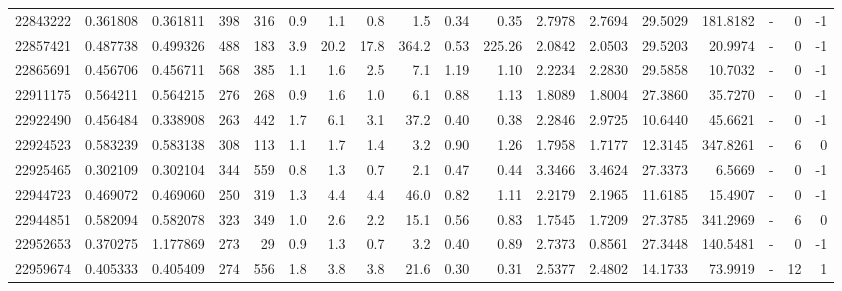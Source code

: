 \begin{tabular}{rrrrrrrrrrrrrrrlrr}
  22843222 & 0.361808 &   0.361811 &  398 &  316 &      0.9 &      1.1 &     0.8 &      1.5 &       0.34 &        0.35 &  2.7978 &  2.7694 &   29.5029 &  181.8182 &             - &        0 &         -1 \\
  22857421 & 0.487738 &   0.499326 &  488 &  183 &      3.9 &     20.2 &    17.8 &    364.2 &       0.53 &      225.26 &  2.0842 &  2.0503 &   29.5203 &   20.9974 &             - &        0 &         -1 \\
  22865691 & 0.456706 &   0.456711 &  568 &  385 &      1.1 &      1.6 &     2.5 &      7.1 &       1.19 &        1.10 &  2.2234 &  2.2830 &   29.5858 &   10.7032 &             - &        0 &         -1 \\
  22911175 & 0.564211 &   0.564215 &  276 &  268 &      0.9 &      1.6 &     1.0 &      6.1 &       0.88 &        1.13 &  1.8089 &  1.8004 &   27.3860 &   35.7270 &             - &        0 &         -1 \\
  22922490 & 0.456484 &   0.338908 &  263 &  442 &      1.7 &      6.1 &     3.1 &     37.2 &       0.40 &        0.38 &  2.2846 &  2.9725 &   10.6440 &   45.6621 &             - &        0 &         -1 \\
  22924523 & 0.583239 &   0.583138 &  308 &  113 &      1.1 &      1.7 &     1.4 &      3.2 &       0.90 &        1.26 &  1.7958 &  1.7177 &   12.3145 &  347.8261 &             - &        6 &          0 \\
  22925465 & 0.302109 &   0.302104 &  344 &  559 &      0.8 &      1.3 &     0.7 &      2.1 &       0.47 &        0.44 &  3.3466 &  3.4624 &   27.3373 &    6.5669 &             - &        0 &         -1 \\
  22944723 & 0.469072 &   0.469060 &  250 &  319 &      1.3 &      4.4 &     4.4 &     46.0 &       0.82 &        1.11 &  2.2179 &  2.1965 &   11.6185 &   15.4907 &             - &        0 &         -1 \\
  22944851 & 0.582094 &   0.582078 &  323 &  349 &      1.0 &      2.6 &     2.2 &     15.1 &       0.56 &        0.83 &  1.7545 &  1.7209 &   27.3785 &  341.2969 &             - &        6 &          0 \\
  22952653 & 0.370275 &   1.177869 &  273 &   29 &      0.9 &      1.3 &     0.7 &      3.2 &       0.40 &        0.89 &  2.7373 &  0.8561 &   27.3448 &  140.5481 &             - &        0 &         -1 \\
  22959674 & 0.405333 &   0.405409 &  274 &  556 &      1.8 &      3.8 &     3.8 &     21.6 &       0.30 &        0.31 &  2.5377 &  2.4802 &   14.1733 &   73.9919 &             - &       12 &          1 \\

\end{tabular}
